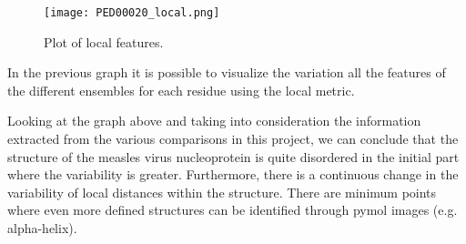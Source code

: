 \begin{figure}[H]
	\begin{minipage}[b]{0.97\textwidth}
		\centering
		\texttt{[image: PED00020\_local.png]}
		\caption{Plot of local features.}
		\label{plot}
	\end{minipage}	
\end{figure}
In the previous graph it is possible to visualize the variation all the features of the different ensembles for each residue using the local metric. 

Looking at the graph above and taking into consideration the information extracted from the various comparisons in this project, we can conclude that the structure of the measles virus nucleoprotein is quite disordered in the initial part where the variability is greater. Furthermore, there is a continuous change in the variability of local distances within the structure. There are minimum points where even more defined structures can be identified through pymol images (e.g. alpha-helix).